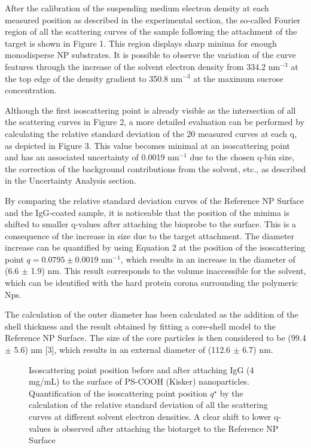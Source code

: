 After the calibration of the suspending medium electron density at each measured position as described in the experimental section, the so-called Fourier region of all the scattering curves of the sample following the attachment of the target is shown in Figure 1. This region displays sharp minima for enough monodisperse NP substrates. It is possible to observe the variation of the curve features through the increase of the solvent electron density from 334.2 nm$^{-3}$ at the top edge of the density gradient to 350.8 nm$^{-3}$ at the maximum sucrose concentration.

Although the first isoscattering point is already visible as the intersection of all the scattering curves in Figure 2, a more detailed evaluation can be performed by calculating the relative standard deviation of the 20 measured curves at each q, as depicted in Figure 3. This value becomes minimal at an isoscattering point and has an associated uncertainty of 0.0019 nm$^{-1}$ due to the chosen q-bin size, the correction of the background contributions from the solvent, etc., as described in the Uncertainty Analysis section.

By comparing the relative standard deviation curves of the Reference NP Surface and the IgG-coated sample, it is noticeable that the position of the minima is shifted to smaller q-values after attaching the bioprobe to the surface. This is a consequence of the increase in size due to the target attachment. The diameter increase can be quantified by using Equation 2 at the position of the isoscattering point $q=0.0795\pm0.0019$ nm$^{-1}$, which results in an increase in the diameter of (6.6 $\pm$ 1.9) nm. This result corresponds to the volume inaccessible for the solvent, which can be identified with the hard protein corona surrounding the polymeric Nps.

The calculation of the outer diameter has been calculated as the addition of the shell thickness and the result obtained by fitting a core-shell model to the Reference NP Surface. The size of the core particles is then considered to be  (99.4 $\pm$ 5.6) nm [3], which results in an external diameter of (112.6 $\pm$ 6.7) nm.

\begin{figure}
	\centering
		
		\caption{Isoscattering point position before and after attaching IgG (4 mg/mL) to the surface of PS-COOH (Kisker) nanoparticles. Quantification of the isoscattering point position $q^{\star}$ by the calculation of the relative standard deviation of all the scattering curves at different solvent electron densities. A clear shift to lower q-values is observed after attaching the biotarget to the Reference NP Surface}
		\label{fig:CoatedKiskerIsopointComp}
\end{figure}


